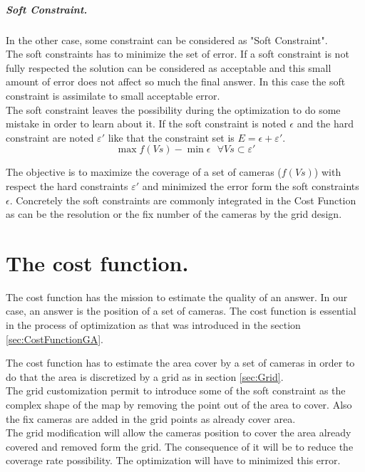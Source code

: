  \subparagraph{Soft Constraint.}
 In the other case, some constraint can be considered as "Soft Constraint".\\ 
 The soft constraints has to minimize the set of error. If a soft constraint is not fully respected the solution can be considered as acceptable and this small amount of error does not affect so much the final answer. In this case the soft constraint is assimilate to small acceptable error. \\
 The soft constraint leaves the possibility during the optimization to do some mistake in order to learn about it.  
 If the soft constraint is noted $\epsilon$ and the hard constraint are noted $ \varepsilon '$ like that the constraint set is $E=\epsilon+\varepsilon'$.\\
 
  \begin{equation}\label{eq:constraintEpsilon}
 	\max f(Vs) - \min \epsilon  \mbox{  } \forall Vs \subset \varepsilon'
 \end{equation}
 
The objective is to maximize the coverage of a set of cameras ($f(Vs)$) with respect the hard constraints $\varepsilon'$ and minimized the error form the soft constraints $\epsilon$.
Concretely the soft constraints are commonly integrated in the Cost Function as can be the resolution or the fix number of the cameras by the grid design. 


\section{The cost function.} \label{sec:costFun}

The cost function has the mission to estimate the quality of an answer. In our case, an answer is the position  of a set of cameras. The cost function is essential in the process of optimization as that was introduced in the section \ref{sec:CostFunctionGA}.

The cost function has to estimate the area cover by a set of cameras in order to do that the area is discretized by a grid as in section \ref{sec:Grid}. \\
The grid customization permit to introduce some of the soft constraint as the complex shape of the map by removing the point out of the area to cover. Also the fix cameras are added in the grid points as already cover area. \\
The grid modification will allow the cameras position to cover the area already covered and removed form the grid. The consequence of it will be to reduce the coverage rate possibility. The optimization will have to minimized this error.

